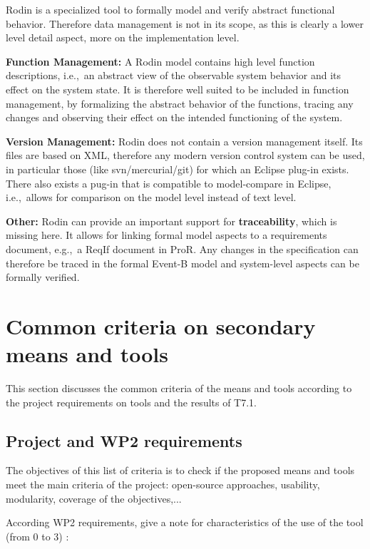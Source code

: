 \begin{author_comment}
  Rodin is a specialized tool to formally model and verify abstract functional
  behavior. Therefore data management is not in its scope, as this is clearly a
  lower level detail aspect, more on the implementation level.

  \textbf{Function Management:} A Rodin model contains high level function
  descriptions, i.e.,\ an abstract view of the observable system behavior and
  its effect on the system state. It is therefore well suited to be included in
  function management, by formalizing the abstract behavior of the functions,
  tracing any changes and observing their effect on the intended functioning of
  the system.

  \textbf{Version Management:} Rodin does not contain a version management
  itself. Its files are based on XML, therefore any modern version control
  system can be used, in particular those (like svn/mercurial/git) for which an
  Eclipse plug-in exists. There also exists a pug-in that is compatible to
  model-compare in Eclipse, i.e.,\ allows for comparison on the model level
  instead of text level.

  \textbf{Other:} Rodin can provide an important support for
  \textbf{traceability}, which is missing here. It allows for linking formal
  model aspects to a requirements document, e.g.,\ a ReqIf document in ProR. Any
  changes in the specification can therefore be traced in the formal Event-B
  model and system-level aspects can be formally verified.
\end{author_comment}

\section{Common criteria on secondary means and tools}
\label{common}
This section discusses the common criteria of the means and tools according to the project requirements on tools and the results of T7.1.

\subsection{Project and WP2 requirements}

The objectives of this list of criteria is to check if the proposed means and tools meet the main criteria of the project: open-source approaches, usability, modularity, coverage of the objectives,...

According WP2 requirements, give a note for characteristics of the use of the tool (from 0 to 3) :

